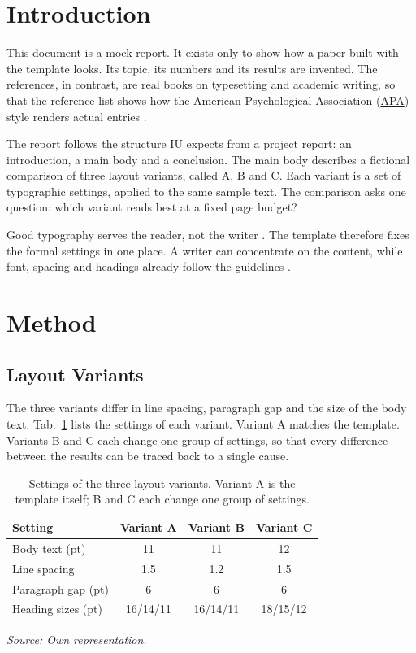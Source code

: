 \documentclass[11pt,a4paper]{article}
\newcommand{\gl}[2]{\hyperlink{gl:#1}{#2}}
\newcommand{\srcnote}[2][\linewidth]{%
  {\setlength{\parskip}{0pt}\par\nobreak\vspace{6pt}%
   \noindent\parbox{#1}{\raggedright\itshape\fontsize{10}{12}\selectfont Source: #2}\par}}
\renewcommand{\arraystretch}{1.1}
\newcommand{\tablefontsize}{\fontsize{9}{10.5}\selectfont
  \renewcommand{\arraystretch}{1.0}\setlength{\tabcolsep}{6pt}}
\begin{document}
\newpage
{}
\setcounter{page}{1}
\setcounter{table}{0}
\setcounter{figure}{0}

\section{Introduction}

This document is a mock report. It exists only to show how a paper built with
the template looks. Its topic, its numbers and its results are invented. The
references, in contrast, are real books on typesetting and academic writing,
so that the reference list shows how the American Psychological Association
(\gl{apa}{APA}) style renders actual entries \parencite{apa2020}.

The report follows the structure IU expects from a project report: an
introduction, a main body and a conclusion. The main body describes a
fictional comparison of three layout variants, called A, B and C. Each
variant is a set of typographic settings, applied to the same sample text.
The comparison asks one question: which variant reads best at a fixed page
budget?

Good typography serves the reader, not the writer \parencite[p.~1]{knuth1984}.
The template therefore fixes the formal settings in one place. A writer can
concentrate on the content, while font, spacing and headings already follow
the guidelines \parencite{lamport1994}.

\section{Method}

\subsection{Layout Variants}

The three variants differ in line spacing, paragraph gap and the size of the
body text. Tab.~\ref{tab:variants} lists the settings of each variant. Variant
A matches the template. Variants B and C each change one group of settings,
so that every difference between the results can be traced back to a single
cause.

\begin{table}[H]
  \centering
  \caption{Settings of the three layout variants. Variant A is the template
  itself; B and C each change one group of settings.}
  \label{tab:variants}
  {\tablefontsize
  \begin{tabular}{@{}lccc@{}}
    \toprule
    Setting & Variant A & Variant B & Variant C \\
    \midrule
    Body text (pt)        & 11  & 11  & 12  \\
    Line spacing          & 1.5 & 1.2 & 1.5 \\
    Paragraph gap (pt)    & 6   & 6   & 6   \\
    Heading sizes (pt)    & 16/14/11 & 16/14/11 & 18/15/12 \\
    \bottomrule
  \end{tabular}}
  \srcnote{Own representation.}
\end{table}
\end{document}
